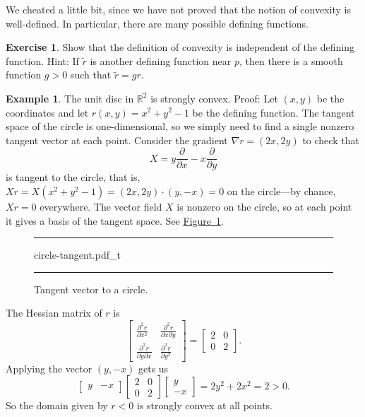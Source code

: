 \documentclass[12pt,openany]{book}
\newcommand{\R}{{\mathbb{R}}}
\theoremstyle{plain}
\theoremstyle{remark}
\theoremstyle{definition}
\newenvironment{exbox}{%
    \def\FrameCommand{\vrule width 1pt \relax\hspace{10pt}}%
    \MakeFramed{\advance\hsize-\width\FrameRestore}%
}{%
    \endMakeFramed
}
\newenvironment{myfig}{%
\begin{figure}[h!t]
\noindent\rule{\textwidth}{0.5pt}\vspace{12pt}\par\centering}%
{\par\noindent\rule{\textwidth}{0.5pt}
\end{figure}}
\theoremstyle{exercise}
\newtheorem{exercise}{Exercise}[section]
\theoremstyle{example}
\newtheorem{example}[thm]{Example}
\newcommand{\figureref}[1]{\hyperref[#1]{Figure~\ref*{#1}}}
\begin{document}
We cheated a little bit, since we have not proved that
the notion of convexity is well-defined.  In particular, there are many possible
defining functions.

\begin{exbox}
\begin{exercise}
Show that the definition of convexity is independent of the defining
function.  Hint: If $\tilde{r}$ is another defining function near $p$,
then there is a smooth function $g > 0$ such that $\tilde{r} = g r$.
\end{exercise}
\end{exbox}

\begin{example}
The unit disc in $\R^2$ is strongly convex.
Proof:
Let $(x,y)$ be the coordinates and
let $r(x,y) = x^2+y^2-1$ be the
defining function.
The tangent space of the circle is one-dimensional, so we simply need to
find a single nonzero tangent vector at each point.
Consider the gradient
%
$\nabla r = (2x,2y)$ to check that
\begin{equation*}
X = y \frac{\partial}{\partial x} - x \frac{\partial}{\partial y}
\end{equation*}
is tangent to the circle, that is,
$Xr = X(x^2+y^2-1) = (2x,2y) \cdot (y,-x) = 0$ on the circle---by chance, $Xr=0$ everywhere.
The vector field $X$ is nonzero on the circle, so at each point it gives a
basis of the tangent space.  See \figureref{fig:circle-tangent}.
\begin{myfig}
{circle-tangent.pdf_t}
\caption{Tangent vector to a circle.\label{fig:circle-tangent}}
\end{myfig}

The Hessian matrix of $r$ is
\begin{equation*}
\begin{bmatrix}
\frac{\partial^2 r}{\partial x^2} &
\frac{\partial^2 r}{\partial x \partial y} \\
\frac{\partial^2 r}{\partial y \partial x} &
\frac{\partial^2 r}{\partial y^2}
\end{bmatrix}
=
\begin{bmatrix}
2 & 0 \\
0 & 2
\end{bmatrix} .
\end{equation*}
Applying the vector $(y,-x)$ gets us
\begin{equation*}
\begin{bmatrix}
y & -x
\end{bmatrix}
\begin{bmatrix}
2 & 0 \\
0 & 2
\end{bmatrix}
\begin{bmatrix}
y \\ -x
\end{bmatrix}
=
2y^2+2x^2 = 2 > 0 .
\end{equation*}
So the domain given by $r < 0$ is strongly convex at all points.
\end{example}
\end{document}

